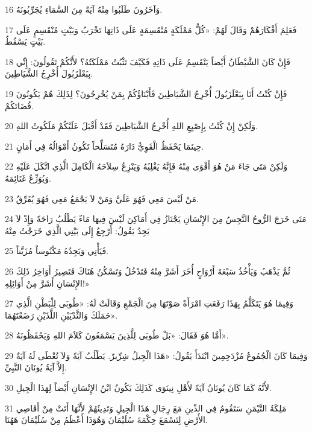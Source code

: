 \par 16 وَآخَرُونَ طَلَبُوا مِنْهُ آيَةً مِنَ السَّمَاءِ يُجَرِّبُونَهُ.
\par 17 فَعَلِمَ أَفْكَارَهُمْ وَقَالَ لَهُمْ: «كُلُّ مَمْلَكَةٍ مُنْقَسِمَةٍ عَلَى ذَاتِهَا تَخْرَبُ وَبَيْتٍ مُنْقَسِمٍ عَلَى بَيْتٍ يَسْقُطُ.
\par 18 فَإِنْ كَانَ الشَّيْطَانُ أَيْضاً يَنْقَسِمُ عَلَى ذَاتِهِ فَكَيْفَ تَثْبُتُ مَمْلَكَتُهُ؟ لأَنَّكُمْ تَقُولُونَ: إِنِّي بِبَعْلَزَبُولَ أُخْرِجُ الشَّيَاطِينَ.
\par 19 فَإِنْ كُنْتُ أَنَا بِبَعْلَزَبُولَ أُخْرِجُ الشَّيَاطِينَ فَأَبْنَاؤُكُمْ بِمَنْ يُخْرِجُونَ؟ لِذَلِكَ هُمْ يَكُونُونَ قُضَاتَكُمْ.
\par 20 وَلَكِنْ إِنْ كُنْتُ بِإِصْبِعِ اللهِ أُخْرِجُ الشَّيَاطِينَ فَقَدْ أَقْبَلَ عَلَيْكُمْ مَلَكُوتُ اللهِ.
\par 21 حِينَمَا يَحْفَظُ الْقَوِيُّ دَارَهُ مُتَسَلِّحاً تَكُونُ أَمْوَالُهُ فِي أَمَانٍ.
\par 22 وَلَكِنْ مَتَى جَاءَ مَنْ هُوَ أَقْوَى مِنْهُ فَإِنَّهُ يَغْلِبُهُ وَيَنْزِعُ سِلاَحَهُ الْكَامِلَ الَّذِي اتَّكَلَ عَلَيْهِ وَيُوَزِّعُ غَنَائِمَهُ.
\par 23 مَنْ لَيْسَ مَعِي فَهُوَ عَلَيَّ وَمَنْ لاَ يَجْمَعُ مَعِي فَهُوَ يُفَرِّقُ.
\par 24 مَتَى خَرَجَ الرُّوحُ النَّجِسُ مِنَ الإِنْسَانِ يَجْتَازُ فِي أَمَاكِنَ لَيْسَ فِيهَا مَاءٌ يَطْلُبُ رَاحَةً وَإِذْ لاَ يَجِدُ يَقُولُ: أَرْجِعُ إِلَى بَيْتِي الَّذِي خَرَجْتُ مِنْهُ
\par 25 فَيَأْتِي وَيَجِدُهُ مَكْنُوساً مُزَيَّناً.
\par 26 ثُمَّ يَذْهَبُ وَيَأْخُذُ سَبْعَةَ أَرْوَاحٍ أُخَرَ أَشَرَّ مِنْهُ فَتَدْخُلُ وَتَسْكُنُ هُنَاكَ فَتَصِيرُ أَوَاخِرُ ذَلِكَ الإِنْسَانِ أَشَرَّ مِنْ أَوَائِلِهِ!»
\par 27 وَفِيمَا هُوَ يَتَكَلَّمُ بِهَذَا رَفَعَتِ امْرَأَةٌ صَوْتَهَا مِنَ الْجَمْعِ وَقَالَتْ لَهُ: «طُوبَى لِلْبَطْنِ الَّذِي حَمَلَكَ وَالثَّدْيَيْنِ اللَّذَيْنِ رَضَعْتَهُمَا».
\par 28 أَمَّا هُوَ فَقَالَ: «بَلْ طُوبَى لِلَّذِينَ يَسْمَعُونَ كَلاَمَ اللهِ وَيَحْفَظُونَهُ».
\par 29 وَفِيمَا كَانَ الْجُمُوعُ مُزْدَحِمِينَ ابْتَدَأَ يَقُولُ: «هَذَا الْجِيلُ شِرِّيرٌ. يَطْلُبُ آيَةً وَلاَ تُعْطَى لَهُ آيَةٌ إِلاَّ آيَةُ يُونَانَ النَّبِيِّ.
\par 30 لأَنَّهُ كَمَا كَانَ يُونَانُ آيَةً لأَهْلِ نِينَوَى كَذَلِكَ يَكُونُ ابْنُ الإِنْسَانِ أَيْضاً لِهَذَا الْجِيلِ.
\par 31 مَلِكَةُ التَّيْمَنِ سَتَقُومُ فِي الدِّينِ مَعَ رِجَالِ هَذَا الْجِيلِ وَتَدِينُهُمْ لأَنَّهَا أَتَتْ مِنْ أَقَاصِي الأَرْضِ لِتَسْمَعَ حِكْمَةَ سُلَيْمَانَ وَهُوَذَا أَعْظَمُ مِنْ سُلَيْمَانَ هَهُنَا.
